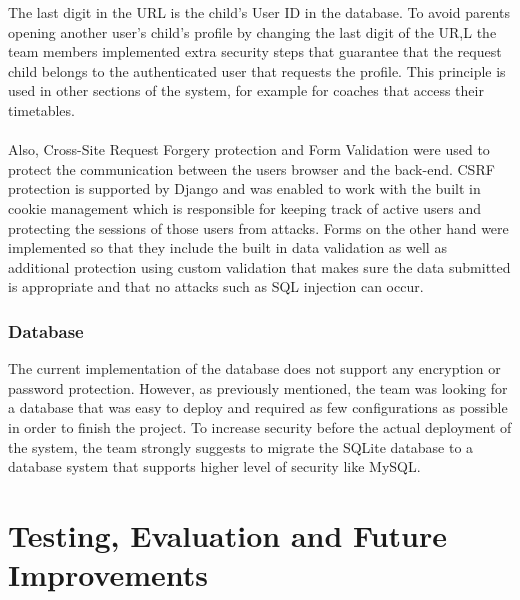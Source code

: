 \documentclass{l3proj}
\begin{document}
The last digit in the URL is the child's User ID in the database. To avoid parents opening another user's child's profile by changing the last digit of the UR,L the team members implemented extra security steps that guarantee that the request child belongs to the authenticated user that requests the profile. This principle is used in other sections of the system, for example for coaches that access their timetables.
\\
\\ Also, Cross-Site Request Forgery protection and Form Validation were used to protect the communication between the users browser and the back-end. CSRF protection is supported by Django and was enabled to work with the built in cookie management which is responsible for keeping track of active users and protecting the sessions of those users from attacks. Forms on the other hand were implemented so that they include the built in data validation as well as additional protection using custom validation that makes sure the data submitted is appropriate and that no attacks such as SQL injection can occur.

\subsection{Database}
The current implementation of the database does not support any encryption or password protection. However, as previously mentioned, the team was looking for a database that was easy to deploy and required as few configurations as possible in order to finish the project. To increase security before the actual deployment of the system, the team strongly suggests to migrate the SQLite database to a database system that supports higher level of security like MySQL.

\chapter{Testing, Evaluation and Future Improvements}
\label{testevfutimprv}

\end{document}
